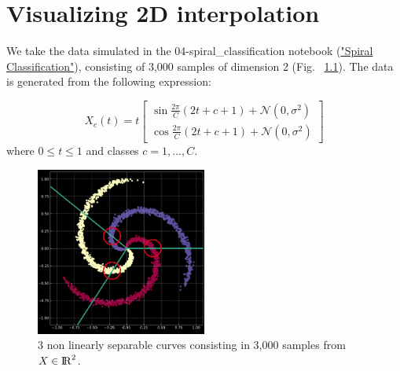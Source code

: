 \chapter{Visualizing 2D interpolation}


We take the data simulated in the 04-spiral\_classification notebook (\href{https://github.com/Atcold/pytorch-Deep-Learning-Minicourse/blob/master/04-spiral\_classification.ipynb} {"Spiral Classification"}), 
consisting of 3,000 samples of dimension 2 (Fig. ~\ref{fig:NonLinearlySeparableParametricCurves2}). 
The data is generated from the following expression:

\[
X_c(t) = t
\begin{bmatrix}
    \sin{\frac{2\pi}{C} (2t+c+1) + \mathcal{N} (0, \sigma^2)} \\
    \cos{\frac{2\pi}{C} (2t+c+1) + \mathcal{N} (0, \sigma^2)}
\end{bmatrix}
\]
where $0 \leq t \leq 1$ and classes $c=1, ..., C$.


\begin{figure}[ht]
\centering
\includegraphics[width=0.5\textwidth]{figs/NonLinearlySeparableParametricCurves.png}
\caption{3 non linearly separable curves consisting in 3,000 samples from $X \in {{\rm I\!R}}^2$.}
\label{fig:NonLinearlySeparableParametricCurves2}
\end{figure}

